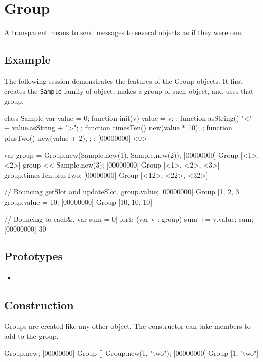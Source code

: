 \section{Group}
A transparent means to send messages to several objects as if they
were one.

\subsection{Example}

The following session demonstrates the features of the Group
objects.  It first creates the \lstinline|Sample| family of object,
makes a group of such object, and uses that group.

\begin{urbiscript}
class Sample
{
  var value = 0;
  function init(v) { value = v; };
  function asString() { "<" + value.asString + ">"; };
  function timesTen() { new(value * 10); };
  function plusTwo()  { new(value + 2); };
};
[00000000] <0>

var group = Group.new(Sample.new(1), Sample.new(2));
[00000000] Group [<1>, <2>]
group << Sample.new(3);
[00000000] Group [<1>, <2>, <3>]
group.timesTen.plusTwo;
[00000000] Group [<12>, <22>, <32>]

// Bouncing getSlot and updateSlot.
group.value;
[00000000] Group [1, 2, 3]
group.value = 10;
[00000000] Group [10, 10, 10]

// Bouncing to each&.
var sum = 0|
for& (var v : group)
  sum += v.value;
sum;
[00000000] 30
\end{urbiscript}

\subsection{Prototypes}

\begin{itemize}
\item {}
\end{itemize}

\subsection{Construction}

Groups are created like any other object. The constructor can
take members to add to the group.

\begin{urbiscript}[firstnumber=last]
Group.new;
[00000000] Group []
Group.new(1, "two");
[00000000] Group [1, "two"]
\end{urbiscript}

